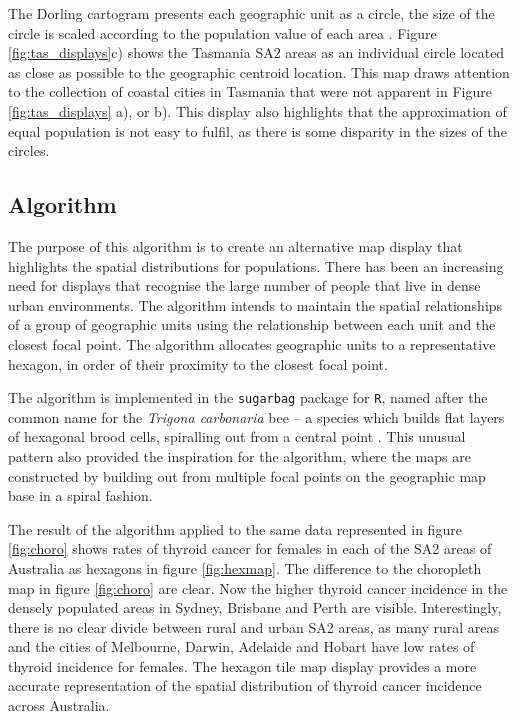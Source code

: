 The Dorling cartogram presents each geographic unit as a circle, the
size of the circle is scaled according to the population value of each
area \citep{ACTUC}. Figure \ref{fig:tas_displays}c) shows the Tasmania
SA2 areas as an individual circle located as close as possible to the
geographic centroid location. This map draws attention to the collection
of coastal cities in Tasmania that were not apparent in Figure
\ref{fig:tas_displays} a), or b). This display also highlights that the
approximation of equal population is not easy to fulfil, as there is
some disparity in the sizes of the circles.

\hypertarget{algorithm}{%
\subsection{Algorithm}\label{algorithm}}

The purpose of this algorithm is to create an alternative map display
that highlights the spatial distributions for populations. There has
been an increasing need for displays that recognise the large number of
people that live in dense urban environments. The algorithm intends to
maintain the spatial relationships of a group of geographic units using
the relationship between each unit and the closest focal point. The
algorithm allocates geographic units to a representative hexagon, in
order of their proximity to the closest focal point.

The algorithm is implemented in the \texttt{sugarbag} package for
\texttt{R}, named after the common name for the \emph{Trigona
carbonaria} bee -- a species which builds flat layers of hexagonal brood
cells, spiralling out from a central point \citep{PH}. This unusual
pattern also provided the inspiration for the algorithm, where the maps
are constructed by building out from multiple focal points on the
geographic map base in a spiral fashion.

The result of the algorithm applied to the same data represented in
figure \ref{fig:choro} shows rates of thyroid cancer for females in each
of the SA2 areas of Australia as hexagons in figure \ref{fig:hexmap}.
The difference to the choropleth map in figure \ref{fig:choro} are
clear. Now the higher thyroid cancer incidence in the densely populated
areas in Sydney, Brisbane and Perth are visible. Interestingly, there is
no clear divide between rural and urban SA2 areas, as many rural areas
and the cities of Melbourne, Darwin, Adelaide and Hobart have low rates
of thyroid incidence for females. The hexagon tile map display provides
a more accurate representation of the spatial distribution of thyroid
cancer incidence across Australia.

